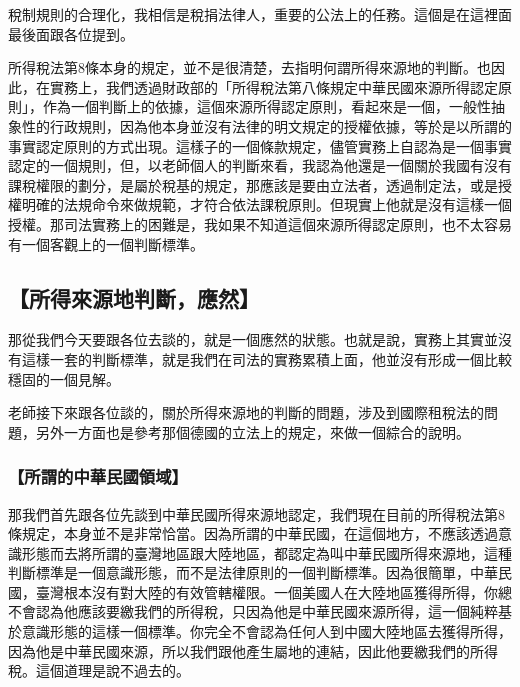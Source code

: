 \documentclass[oneside,sub3section]{ctexbook}
\begin{document}
稅制規則的合理化，我相信是稅捐法律人，重要的公法上的任務。這個是在這裡面最後面跟各位提到。

所得稅法第8條本身的規定，並不是很清楚，去指明何謂所得來源地的判斷。也因此，在實務上，我們透過財政部的「所得稅法第八條規定中華民國來源所得認定原則」，作為一個判斷上的依據，這個來源所得認定原則，看起來是一個，一般性抽象性的行政規則，因為他本身並沒有法律的明文規定的授權依據，等於是以所謂的事實認定原則的方式出現。這樣子的一個條款規定，儘管實務上自認為是一個事實認定的一個規則，但，以老師個人的判斷來看，我認為他還是一個關於我國有沒有課稅權限的劃分，是屬於稅基的規定，那應該是要由立法者，透過制定法，或是授權明確的法規命令來做規範，才符合依法課稅原則。但現實上他就是沒有這樣一個授權。那司法實務上的困難是，我如果不知道這個來源所得認定原則，也不太容易有一個客觀上的一個判斷標準。

\hypertarget{ux6240ux5f97ux4f86ux6e90ux5730ux5224ux65b7ux61c9ux7136}{%
\subsection{【所得來源地判斷，應然】}\label{ux6240ux5f97ux4f86ux6e90ux5730ux5224ux65b7ux61c9ux7136}}

那從我們今天要跟各位去談的，就是一個應然的狀態。也就是說，實務上其實並沒有這樣一套的判斷標準，就是我們在司法的實務累積上面，他並沒有形成一個比較穩固的一個見解。

老師接下來跟各位談的，關於所得來源地的判斷的問題，涉及到國際租稅法的問題，另外一方面也是參考那個德國的立法上的規定，來做一個綜合的說明。

\hypertarget{ux6240ux8b02ux7684ux4e2dux83efux6c11ux570bux9818ux57df}{%
\subsubsection{【所謂的中華民國領域】}\label{ux6240ux8b02ux7684ux4e2dux83efux6c11ux570bux9818ux57df}}

那我們首先跟各位先談到中華民國所得來源地認定，我們現在目前的所得稅法第8條規定，本身並不是非常恰當。因為所謂的中華民國，在這個地方，不應該透過意識形態而去將所謂的臺灣地區跟大陸地區，都認定為叫中華民國所得來源地，這種判斷標準是一個意識形態，而不是法律原則的一個判斷標準。因為很簡單，中華民國，臺灣根本沒有對大陸的有效管轄權限。一個美國人在大陸地區獲得所得，你總不會認為他應該要繳我們的所得稅，只因為他是中華民國來源所得，這一個純粹基於意識形態的這樣一個標準。你完全不會認為任何人到中國大陸地區去獲得所得，因為他是中華民國來源，所以我們跟他產生屬地的連結，因此他要繳我們的所得稅。這個道理是說不過去的。
\end{document}

